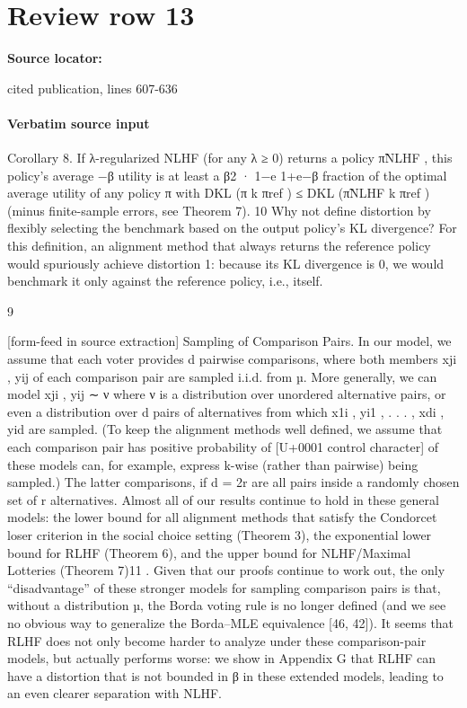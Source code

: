 \documentclass[10pt]{article}
\begin{document}
\section*{Review row 13}
\textbf{Source locator:} {\footnotesize\raggedright cited publication, lines 607-\allowbreak{}636\par}
\paragraph{Verbatim source input}
\begin{ReviewVerbatim}
Corollary 8. If λ-regularized NLHF (for any λ ≥ 0) returns a policy π̃NLHF , this policy’s average
                               −β
utility is at least a β2 · 1−e
                           1+e−β
                                  fraction of the optimal average utility of any policy π with DKL (π k πref ) ≤
DKL (π̃NLHF k πref ) (minus finite-sample errors, see Theorem 7).
   10
      Why not define distortion by flexibly selecting the benchmark based on the output policy’s KL divergence?
For this definition, an alignment method that always returns the reference policy would spuriously achieve
distortion 1: because its KL divergence is 0, we would benchmark it only against the reference policy, i.e., itself.


                                                               9

[form-feed in source extraction]
Sampling of Comparison Pairs. In our model, we assume that each voter provides d pairwise
comparisons, where both members xji , yij of each comparison pair are sampled i.i.d. from µ. More
generally, we can model {xji , yij } ∼ ν where ν is a distribution over unordered alternative pairs, or
even a distribution over d pairs of alternatives from which {x1i , yi1 , . . . , xdi , yid } are sampled. (To keep
the alignment methods well defined, we assume that each comparison pair has positive probability of
                         [U+0001 control character] of these models can, for example, express k-wise (rather than pairwise)
being sampled.) The latter
comparisons, if d = 2r are all pairs inside a randomly chosen set of r alternatives. Almost all of
our results continue to hold in these general models: the lower bound for all alignment methods that
satisfy the Condorcet loser criterion in the social choice setting (Theorem 3), the exponential lower
bound for RLHF (Theorem 6), and the upper bound for NLHF/Maximal Lotteries (Theorem 7)11 .
Given that our proofs continue to work out, the only “disadvantage” of these stronger models for
sampling comparison pairs is that, without a distribution µ, the Borda voting rule is no longer defined
(and we see no obvious way to generalize the Borda–MLE equivalence [46, 42]). It seems that RLHF
does not only become harder to analyze under these comparison-pair models, but actually performs
worse: we show in Appendix G that RLHF can have a distortion that is not bounded in β in these
extended models, leading to an even clearer separation with NLHF.


\end{ReviewVerbatim}
\end{document}
